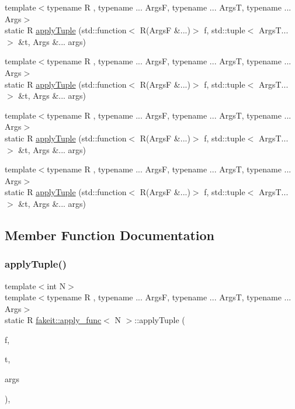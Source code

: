 \begin{DoxyCompactItemize}
\item 
{\footnotesize template$<$typename R , typename ... ArgsF, typename ... ArgsT, typename ... Args$>$ }\\static R \mbox{\hyperlink{structfakeit_1_1apply__func_a89d97e5fe47d2293248f1832a6ebd14f}{apply\+Tuple}} (std\+::function$<$ R(ArgsF \&...)$>$ f, std\+::tuple$<$ Args\+T... $>$ \&t, Args \&... args)
\item 
{\footnotesize template$<$typename R , typename ... ArgsF, typename ... ArgsT, typename ... Args$>$ }\\static R \mbox{\hyperlink{structfakeit_1_1apply__func_a89d97e5fe47d2293248f1832a6ebd14f}{apply\+Tuple}} (std\+::function$<$ R(ArgsF \&...)$>$ f, std\+::tuple$<$ Args\+T... $>$ \&t, Args \&... args)
\item 
{\footnotesize template$<$typename R , typename ... ArgsF, typename ... ArgsT, typename ... Args$>$ }\\static R \mbox{\hyperlink{structfakeit_1_1apply__func_a89d97e5fe47d2293248f1832a6ebd14f}{apply\+Tuple}} (std\+::function$<$ R(ArgsF \&...)$>$ f, std\+::tuple$<$ Args\+T... $>$ \&t, Args \&... args)
\item 
{\footnotesize template$<$typename R , typename ... ArgsF, typename ... ArgsT, typename ... Args$>$ }\\static R \mbox{\hyperlink{structfakeit_1_1apply__func_a89d97e5fe47d2293248f1832a6ebd14f}{apply\+Tuple}} (std\+::function$<$ R(ArgsF \&...)$>$ f, std\+::tuple$<$ Args\+T... $>$ \&t, Args \&... args)
\end{DoxyCompactItemize}


\subsection{Member Function Documentation}
\mbox{\label{structfakeit_1_1apply__func_a89d97e5fe47d2293248f1832a6ebd14f}} 
\subsubsection{\texorpdfstring{applyTuple()}{applyTuple()}\hspace{0.1cm}{\footnotesize\ttfamily [1/9]}}
{\footnotesize\ttfamily template$<$int N$>$ \\
template$<$typename R , typename ... ArgsF, typename ... ArgsT, typename ... Args$>$ \\
static R \mbox{\hyperlink{structfakeit_1_1apply__func}{fakeit\+::apply\+\_\+func}}$<$ N $>$\+::apply\+Tuple (\begin{DoxyParamCaption}\item[{std\+::function$<$ R(ArgsF \&...)$>$}]{f,  }\item[{std\+::tuple$<$ Args\+T... $>$ \&}]{t,  }\item[{Args \&...}]{args }\end{DoxyParamCaption})\hspace{0.3cm}{\ttfamily [inline]}, {\ttfamily [static]}}

